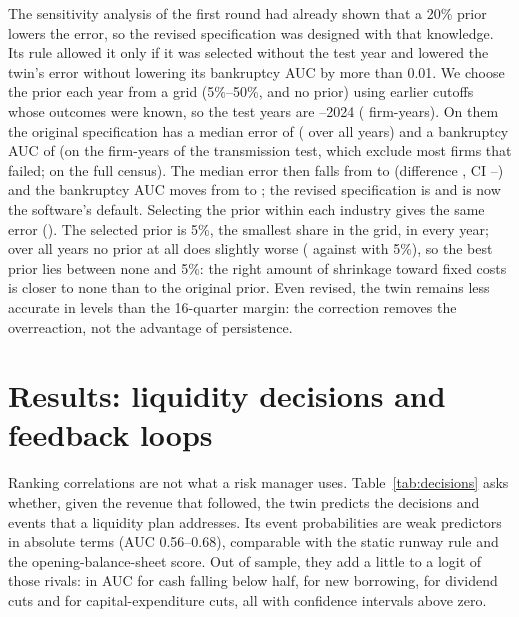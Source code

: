 \documentclass[11pt]{article}
\begin{document}
The sensitivity analysis of the first round had already shown that a 20\% prior lowers the error, so the revised specification was designed with that knowledge. Its rule allowed it only if it was selected without the test year and lowered the
twin's error without lowering its bankruptcy AUC by more than 0.01. We choose the prior each year from a grid
(5\%--50\%, and no prior) using earlier cutoffs whose outcomes were known, so the test years are \RevFirstYear--2024 (\RevTestN{} firm-years). On them the original specification has a median error of \RevMaeBase{} (\TrMaeTone{} over all years) and a bankruptcy AUC of \RevAucBase{} (on the firm-years of the transmission test, which exclude most firms that failed; \BkPanTwin{} on the full census). The median error then falls from \RevMaeBase{} to \RevMaeNew{} (difference
\RevDiff, CI \RevDiffLo--\RevDiffHi) and the bankruptcy AUC moves from \RevAucBase{} to \RevAucNew; the revised
specification is \RevAccepted{} and is now the software's default. Selecting the prior within each industry gives the
same error (\RevIndMae). The selected prior is 5\%, the smallest share in the grid, in every year; over all years no prior at all does slightly worse
(\RevNone{} against \RevFive{} with 5\%), so the best prior lies between none and 5\%: the right amount of shrinkage toward fixed costs is closer to none than to the original prior. Even revised,
the twin remains less accurate in levels than the 16-quarter margin: the correction removes the overreaction, not the
advantage of persistence.

\section{Results: liquidity decisions and feedback loops}\label{sec:decisions}
Ranking correlations are not what a risk manager uses. Table~\ref{tab:decisions} asks whether, given the revenue that followed, the twin predicts the decisions and events that a liquidity plan addresses. Its event probabilities are weak predictors in absolute terms (AUC 0.56--0.68), comparable with the static runway rule and the opening-balance-sheet score. Out of sample, they add a little to a logit of those rivals: \DecCashDelta{} in AUC for cash falling below half, \DecDebtDelta{} for new borrowing, \DecDivDelta{} for dividend cuts and \DecCapexDelta{} for capital-expenditure cuts, all with confidence intervals above zero.
\end{document}
